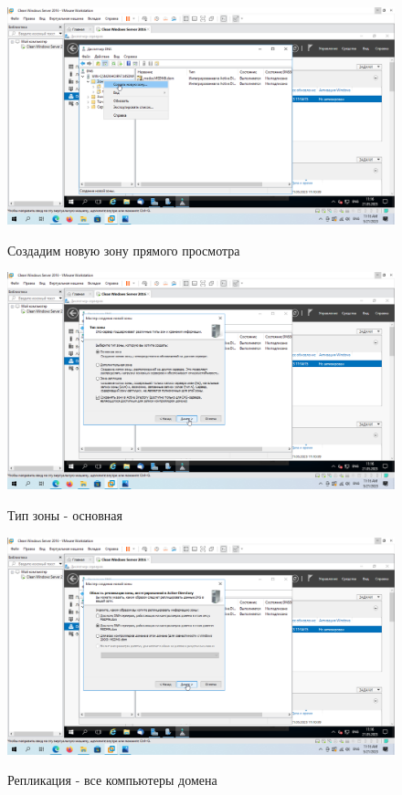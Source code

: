 \documentclass[a4paper]{article}
\begin{document}
  \begin{figure}[H]
    \centering
    \includegraphics[width=\textwidth]{11_0073}
    \label{img:73}
    \caption{Создадим новую зону прямого просмотра}
  \end{figure}

  \begin{figure}[H]
    \centering
    \includegraphics[width=\textwidth]{11_0074}
    \label{img:74}
    \caption{Тип зоны - основная}
  \end{figure}

  \begin{figure}[H]
    \centering
    \includegraphics[width=\textwidth]{11_0075}
    \label{img:75}
    \caption{Репликация - все компьютеры домена}
  \end{figure}
\end{document}
